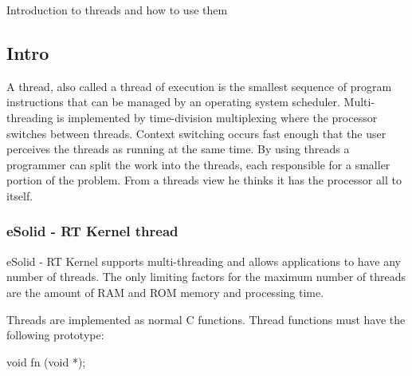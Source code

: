 Introduction to threads and how to use them\hypertarget{threads_threads_intro}{}\subsection{Intro}\label{threads_threads_intro}
A thread, also called a thread of execution is the smallest sequence of program instructions that can be managed by an operating system scheduler. Multi-\/threading is implemented by time-\/division multiplexing where the processor switches between threads. Context switching occurs fast enough that the user perceives the threads as running at the same time. By using threads a programmer can split the work into the threads, each responsible for a smaller portion of the problem. From a threads view he thinks it has the processor all to itself.\hypertarget{threads_kern_threads}{}\subsubsection{e\-Solid -\/ R\-T Kernel thread}\label{threads_kern_threads}
e\-Solid -\/ R\-T Kernel supports multi-\/threading and allows applications to have any number of threads. The only limiting factors for the maximum number of threads are the amount of R\-A\-M and R\-O\-M memory and processing time.

Threads are implemented as normal {\ttfamily C} functions. Thread functions must have the following prototype\-:


\begin{DoxyCode}
\textcolor{keywordtype}{void} fn (\textcolor{keywordtype}{void} *);
\end{DoxyCode}


